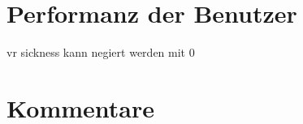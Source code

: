 \section{Performanz der Benutzer}


vr sickness kann negiert werden mit 0%

\section{Kommentare}




















